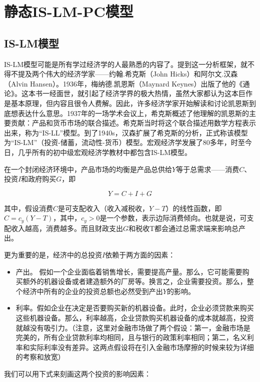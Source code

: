 \documentclass[cn,12pt,math=newtx,citestyle=gb7714-2015,bibstyle=gb7714-2015]{elegantbook}
\begin{document}
	\section{静态IS-LM-PC模型}
	\subsection{IS-LM模型}
	IS-LM模型可能是所有学过经济学的人最熟悉的内容了。提到这一分析框架，就不得不提及两个伟大的经济学家——约翰.希克斯（John Hicks）和阿尔文.汉森（Alvin Hansen）。1936年，梅纳德.凯恩斯（Maynard Keynes）出版了他的《通论》。这本书一经面世，就引起了经济学界的极大热情，虽然大家都认为这本巨作是基本原理，但内容且很令人费解。因此，许多经济学家开始解读和讨论凯恩斯到底想表达什么意思。1937年的一场学术会议上，希克斯概述了他理解的凯恩斯的主要贡献：产品和货币市场的联合描述。希克斯当时将这个联合描述用数学方程表示出来，称为“IS-LL”模型。到了1940s，汉森扩展了希克斯的分析，正式称该模型为“IS-LM”（投资-储蓄，流动性-货币）模型。宏观经济学发展了80多年，时至今日，几乎所有的初中级宏观经济学教材中都包含IS-LM模型。
	
	在一个封闭经济环境中，产品市场的均衡是产品总供给$Y$等于总需求——消费$C$、投资$I$和政府购买$G$，即
	
	\begin{equation}
		Y = C + I + G
	\end{equation}
	
	其中，假设消费$C$是可支配收入（收入减税收，$Y-T$）的线性函数，即$C=c_y (Y-T)$，其中，$c_y>0$是一个参数，表示边际消费倾向。也就是说，可支配收入越高，消费越多。而且财政支出$G$和税收T都会通过总需求端来影响总产出。
	
	更为重要的是，经济中的总投资$I$依赖于两方面的因素：
	
	\begin{itemize}
		\item [1] 产出。 假如一个企业面临着销售增长，需要提高产量。那么，它可能需要购买额外的机器设备或者建造额外的厂房等。换言之，企业需要投资。那么，整个经济中所有的企业的投资总额也必然受到产出$Y$的影响。
		\item [2] 利率。假如企业在决定是否要购买新的机器设备。此时，企业必须贷款来购买这些机器设备。那么，利率越高，企业贷款购买机器设备的成本就越高，投资就越没有吸引力。（注意，这里对金融市场做了两个假设：第一，金融市场是完美的，所有企业贷款利率均相同，且与银行的政策利率相同；第二，名义利率和实际利率没有差异。这两点假设将在引入金融市场摩擦的时候来较为详细的考察和放宽）
	\end{itemize}
	
	我们可以用下式来刻画这两个投资的影响因素：
	
\end{document}

